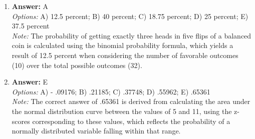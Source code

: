 \documentclass[12pt]{article}
\begin{document}
\begin{enumerate}[label=\arabic*.]
\item \textbf{Answer:} A
\\ \textit{Options:} A) 12.5 percent; B) 40 percent; C) 18.75 percent; D) 25 percent; E) 37.5 percent
\\ \textit{Note:} The probability of getting exactly three heads in five flips of a balanced coin is calculated using the binomial probability formula, which yields a result of 12.5 percent when considering the number of favorable outcomes (10) over the total possible outcomes (32).
\item \textbf{Answer:} E
\\ \textit{Options:} A) - .09176; B) .21185; C) .37748; D) .55962; E) .65361
\\ \textit{Note:} The correct answer of .65361 is derived from calculating the area under the normal distribution curve between the values of 5 and 11, using the z-scores corresponding to these values, which reflects the probability of a normally distributed variable falling within that range.
\end{enumerate}
\end{document}
